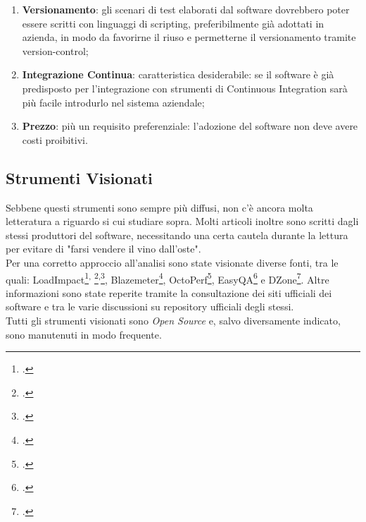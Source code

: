 \begin{enumerate}
	\item \textbf{Versionamento}: gli scenari di test elaborati dal software dovrebbero poter essere scritti con linguaggi di scripting, preferibilmente già adottati in azienda, in modo da favorirne il riuso e permetterne il versionamento tramite \gls{version-control};
	\item \textbf{Integrazione Continua}: caratteristica desiderabile: se il software è già predisposto per l'integrazione con strumenti di Continuous Integration sarà più facile introdurlo nel sistema aziendale;
	\item \textbf{Prezzo}: più un requisito preferenziale: l'adozione del software non deve avere costi proibitivi.
\end{enumerate}
\subsection{Strumenti Visionati}
Sebbene questi strumenti sono sempre più diffusi, non c'è ancora molta letteratura a riguardo si cui studiare sopra. Molti articoli inoltre sono scritti dagli stessi produttori del software, necessitando una certa cautela durante la lettura per evitare di "farsi vendere il vino dall'oste".\\
Per una corretto approccio all'analisi sono state visionate diverse fonti, tra le quali: LoadImpact\footcite{article:libenchmark}\textsuperscript{,} \footcite{article:libenchmark2}\textsuperscript{,}\footcite{article:lireview}, Blazemeter\footcite{article:blzbench}, OctoPerf\footcite{article:octoperf}, EasyQA\footcite{article:easyqa} e DZone\footcite{article:jmetervswrk}. Altre informazioni sono state reperite tramite la consultazione dei siti ufficiali dei software e tra le varie discussioni su repository ufficiali degli stessi. \\
Tutti gli strumenti visionati sono \textit{Open Source} e, salvo diversamente indicato, sono manutenuti in modo frequente.

